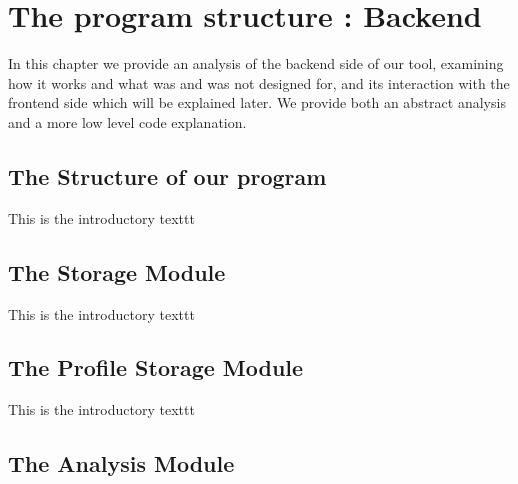 %
%

\chapter{The program structure : Backend}

\begin{resumen}
In this chapter we provide an analysis of the backend side of our tool, examining how it works and what was and was not designed for, and its interaction with the frontend side which will be explained later.
We provide both an abstract analysis and a more low level code explanation.
\end{resumen}


\section{The Structure of our program}
\label{cap1:sec:structure}

This is the introductory texttt

\section{The Storage Module}
\label{cap1:sec:storage}

This is the introductory texttt

\section{The Profile Storage Module}
\label{cap1:sec:profile_storage}

This is the introductory texttt

\section{The Analysis Module}
\label{cap1:sec:analysis}


